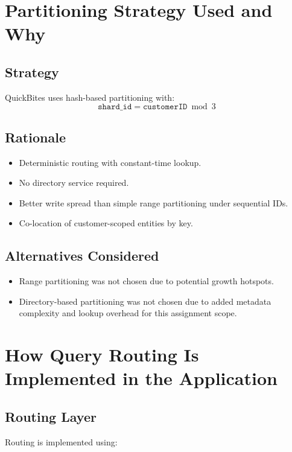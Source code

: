 \documentclass[12pt,a4paper]{article}
\begin{document}
\section{Partitioning Strategy Used and Why}

\subsection{Strategy}

QuickBites uses hash-based partitioning with:
\[
\texttt{shard\_id} = \texttt{customerID} \bmod 3
\]

\subsection{Rationale}

\begin{itemize}[leftmargin=*]
  \item Deterministic routing with constant-time lookup.
  \item No directory service required.
  \item Better write spread than simple range partitioning under sequential IDs.
  \item Co-location of customer-scoped entities by key.
\end{itemize}

\subsection{Alternatives Considered}

\begin{itemize}[leftmargin=*]
  \item Range partitioning was not chosen due to potential growth hotspots.
  \item Directory-based partitioning was not chosen due to added metadata complexity
  and lookup overhead for this assignment scope.
\end{itemize}

\section{How Query Routing Is Implemented in the Application}

\subsection{Routing Layer}

Routing is implemented using:
\end{document}
